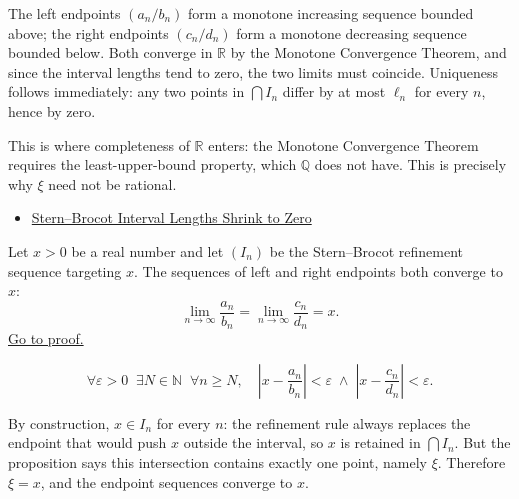 \begin{remark*}[Interpretation]
The left endpoints $(a_n/b_n)$ form a monotone increasing sequence bounded
above; the right endpoints $(c_n/d_n)$ form a monotone decreasing sequence
bounded below.  Both converge in $\mathbb{R}$ by the Monotone Convergence
Theorem, and since the interval lengths tend to zero, the two limits must
coincide.  Uniqueness follows immediately: any two points in
$\bigcap I_n$ differ by at most $\ell_n$ for every $n$, hence by zero.

This is where completeness of $\mathbb{R}$ enters: the Monotone Convergence
Theorem requires the least-upper-bound property, which $\mathbb{Q}$ does
not have.  This is precisely why $\xi$ need not be rational.
\end{remark*}

\begin{dependencies}
\begin{itemize}
  \item \hyperref[lem:sb-length-zero]{Stern--Brocot Interval Lengths Shrink to Zero}
\end{itemize}
\end{dependencies}

\begin{corollary}
\label{cor:sb-path-limit}
Let $x > 0$ be a real number and let $(I_n)$ be the Stern--Brocot
refinement sequence targeting $x$.  The sequences of left and right
endpoints both converge to $x$:
\[
\lim_{n \to \infty} \frac{a_n}{b_n}
= \lim_{n \to \infty} \frac{c_n}{d_n}
= x.
\]
\hyperref[prf:sb-path-limit]{Go to proof.}
\end{corollary}

\begin{remark*}
\[
\forall \varepsilon > 0\;\;
\exists N \in \mathbb{N}\;\;
\forall n \geq N,\quad
\left|x - \frac{a_n}{b_n}\right| < \varepsilon
\;\land\;
\left|x - \frac{c_n}{d_n}\right| < \varepsilon.
\]
\end{remark*}

\begin{remark*}[Interpretation]
By construction, $x \in I_n$ for every $n$: the refinement rule always
replaces the endpoint that would push $x$ outside the interval, so $x$
is retained in $\bigcap I_n$.  But the proposition says this intersection
contains exactly one point, namely $\xi$.  Therefore $\xi = x$, and the
endpoint sequences converge to $x$.
\end{remark*}

